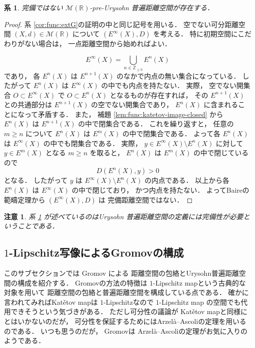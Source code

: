 \documentclass[leqno, 12pt]{jsarticle}
\newtheorem{cor}[thm]{系}
\newtheorem*{rmk}{注意}
\newcommand{\zz}{\mathbb{Z}}
\newcommand{\yozz}[1]{\zz_{\ge #1}}
\newcommand{\rr}{\mathbb{R}}
\newcommand{\SetPointDist}[3]{#1(#2,#3)}
\newcommand{\Met}[1]{\mathscr{M}(#1)}
\newcommand{\Estage}[2]{E^{#1}(#2)}
\begin{document}
\begin{cor}\label{cor:func:noncomp}
完備ではない
$\Met{\rr}$-pre-Urysohn
普遍距離空間が存在する．
\end{cor}
\begin{proof}
系
 \ref{cor:func:extG}の証明の中と同じ記号を用いる．
空でない可分距離空間
$(X, d)\in \Met{\rr}$
について
$(\Estage{\infty}{X}, D)$
を考える．
特に初期空間にこだわりがない場合は，
一点距離空間から始めればよい．




\[
\Estage{\infty}{X}=\bigcup_{n\in \yozz{0}}\Estage{n}{X}
\]
であり，
各
$\Estage{n}{X}$
は
$\Estage{n+1}{X}$
のなかで内点の無い集合になっている．
したがって
$\Estage{n}{X}$
は
$\Estage{\infty}{X}$
の中でも内点を持たない．
実際，
空でない開集合
$O\subset\Estage{\infty}{X}$
で
$O\subset\Estage{n}{X}$
となるものが存在すれば，
その
$\Estage{n+1}{X}$
との共通部分は
$\Estage{n+1}{X}$
の空でない開集合であり，
$\Estage{n}{X}$
に含まれることになって矛盾する．
また，
補題
\ref{lem:func:katetov-image-closed}
から
$\Estage{n}{X}$
は
$\Estage{n+1}{X}$
の中で閉集合である．
これを繰り返すと，
任意の
$m\ge n$
について
$\Estage{n}{X}$
は
$\Estage{m}{X}$
の中で閉集合である．
よって各
$\Estage{n}{X}$
は
$\Estage{\infty}{X}$
の中でも閉集合である．
実際，
$y\in\Estage{\infty}{X}\setminus\Estage{n}{X}$
に対して
$y\in\Estage{m}{X}$
となる
$m\ge n$
を取ると，
$\Estage{n}{X}$
は
$\Estage{m}{X}$
の中で閉じているので
\[
\SetPointDist{D}{\Estage{n}{X}}{y}>0
\]
となる．
したがって
$y$
は
$\Estage{\infty}{X}\setminus\Estage{n}{X}$
の内点である．
以上から各
$\Estage{n}{X}$
は
$\Estage{\infty}{X}$
の中で閉じており，
かつ内点を持たない．
よってBaireの範疇定理から
$(\Estage{\infty}{X}, D)$%
は
完備距離空間ではない．
\end{proof}
\begin{rmk}\label{rmk:function-envelope:completeness}
系
\ref{cor:func:noncomp}
が述べているのはUrysohn
普遍距離空間の定義には完備性が必要ということである．
\end{rmk}

\subsection{\texorpdfstring{$1$}{1}-Lipschitz写像によるGromovの構成}\label{subsec:function-envelope:gromov}
このサブセクションでは
Gromov
\cite{Greenbook}
による
距離空間の包絡とUrysohn普遍距離空間の構成を紹介する．
Gromovの方法の特徴は
$1$-Lipschitz mapという古典的な対象を用いて
距離空間の包絡と普遍距離空間を構成している点である．
確かに言われてみればKat\v{e}tov mapは
$1$-Lipschitzなので
$1$-Lipschitz map
の空間でも代用できそうという気づきがある．
ただし可分性の議論が
Kat\v{e}tov mapと同様にとはいかないのだが，
可分性を保証するためにはArzel\`{a}--Ascoliの定理を用いるのである．%
いつも思うのだが，%
Gromovは
Arzel\`{a}--Ascoliの定理がお気に入りのようである．
\end{document}
